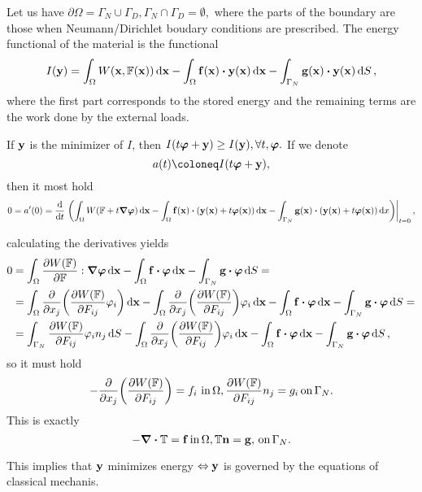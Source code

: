 \documentclass[11pt]{scrartcl} %
\begin{document}
\begin{definition}
    Let us have $\partial \Omega = \Gamma_N \cup \Gamma_D, \Gamma_N \cap \Gamma_D = \emptyset,$ where the parts of the boundary are those when Neumann/Dirichlet boudary conditions are prescribed.
The energy functional of the material is the functional
\[
	I\qty(\vb{y}) = \int_{\Omega}W\qty(\vb{x}, \fgrad\qty(\vb{x}))\dd{\vb{x}} - \int_{\Omega}\vb{f}\qty(\vb{x})\vdot \vb{y}\qty(\vb{x}) \dd{\vb{x}}-\int_{\Gamma_N}\vb{g}\qty(\vb{x}) \vdot \vb{y}\qty(\vb{x})\dd{S},
\]
where the first part corresponds to the stored energy and the remaining terms are the work done by the external loads.
\end{definition}

\begin{remark}
	If $\vb{y}$ is the minimizer of $I$, then $I\qty(t \vb*{\varphi}+\vb{y})\geq I\qty(\vb{y}), \forall t, \vb*{\varphi}.$ If we denote
    \[
	    a(t)\coloneq I\qty(t \vb*{\varphi}+\vb{y}),
    \]
    then it most hold
    \[
	    0 = a'(0) = \dv{t} \eval{\qty(\int_{\Omega}W\qty(\fgrad + t \grad \vb*{\varphi})\dd{\vb{x}}- \int_{\Omega}\vb{f}\qty(\vb{x})\vdot \qty(\vb{y}\qty(\vb{x})+t \vb*{\varphi}\qty(\vb{x}))\dd{\vb{x}} - \int_{\Gamma_N}\vb{g}\qty(\vb{x}) \vdot(\vb{y}\qty(\vb{x})+t \vb*{\varphi}\qty(\vb{x}))\dd{x})}_{t=0},
    \]

calculating the derivatives yields
\begin{align*}
	0 &= \int_{\Omega}\pdv{W\qty(\fgrad)}{\fgrad}: \grad \vb*{\varphi}\dd{\vb{x}} - \int_{\Omega}\vb{f}\vdot \vb*{\varphi}\dd{\vb{x}} - \int_{\Gamma_N}\vb{g}\vdot \vb*{\varphi}\dd{S} =\\
	  &= \int_{\Omega}\pdv{x_j}\qty(\pdv{W\qty(\fgrad)}{F_{ij}}\varphi_i)\dd{\vb{x}}-\int_{\Omega}\pdv{x_j}\qty(\pdv{W\qty(\fgrad)}{F_{ij}})\varphi_i\dd{\vb{x}}- \int_{\Omega}\vb{f}\vdot \vb*{\varphi}\dd{\vb{x}}-\int_{\Gamma_N}\vb{g}\vdot \vb*{\varphi}\dd{S}= \\
	  & = \int_{\Gamma_N}\pdv{W\qty(\fgrad)}{F_{ij}}\varphi_i n_j \dd{S}-\int_{\Omega}\pdv{x_j}\qty(\pdv{W\qty(\fgrad)}{F_{ij}})\varphi_i\dd{\vb{x}}-\int_{\Omega}\vb{f}\vdot \vb*{\varphi}\dd{\vb{x}} - \int_{\Gamma_N}\vb{g} \vdot \vb*{\varphi}\dd{S},
\end{align*}
so it must hold
\[
	-\pdv{x_j}\qty(\pdv{W\qty(\ensuremath{\mathbb{F}})}{F_{ij}})= f_i \ \text{in} \, \Omega, \pdv{W\qty(\ensuremath{\mathbb{F}})}{F_{ij}}n_j=g_i \, \text{on} \, \Gamma_N.
\]
This is exactly
\[
	-\divergence{\pkstress} = \vb{f} \, \text{in} \,\Omega, \pkstress \vb{n} = \vb{g}, \, \text{on} \, \Gamma_N.
\]

This implies that $\vb{y}$ minimizes energy $\Leftrightarrow \vb{y}$ is governed by the equations of classical mechanis.

\end{remark}
\end{document}
